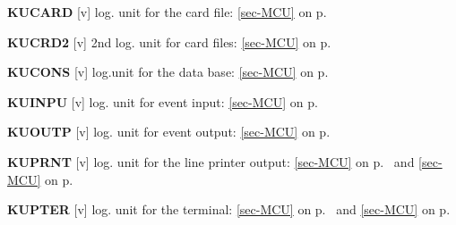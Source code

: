  \item{\bf KUCARD  }[v] log. unit for the card file: \ref{sec-MCU} on p.~\pageref{sec-MCU}\\
 \item{\bf KUCRD2  }[v] 2nd log. unit for card files: \ref{sec-MCU} on p.~\pageref{sec-MCU}\\
 \item{\bf KUCONS  }[v] log.unit for the data base: \ref{sec-MCU} on p.~\pageref{sec-MCU}\\
 \item{\bf KUINPU  }[v] log. unit for event input: \ref{sec-MCU} on p.~\pageref{sec-MCU}\\
 \item{\bf KUOUTP  }[v] log. unit for event output: \ref{sec-MCU} on p.~\pageref{sec-MCU}\\
 \item{\bf KUPRNT  }[v] log. unit for the line printer output:
 \ref{sec-MCU} on p.~\pageref{sec-MCU} and \ref{sec-MCU} on p.~\pageref{sec-MCU}\\
 \item{\bf KUPTER  }[v] log. unit for the terminal:
 \ref{sec-MCU} on p.~\pageref{sec-MCU} and \ref{sec-MCU} on p.~\pageref{sec-MCU}
 
